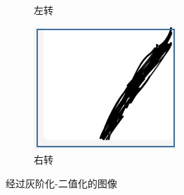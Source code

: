 \documentclass{report}
\begin{document}
\begin{figure}[ht]
\begin{subfigure}[b]{0.3\textwidth}
   \caption{左转}
   \label{fig:label}
 \end{subfigure}
 \hfill
 \begin{subfigure}[b]{0.3\textwidth}
   \centering
   \includegraphics[width=\textwidth]{figures/right.png}
   \caption{右转}
   \label{fig:label}
 \end{subfigure}
 \hfill
  \caption{经过灰阶化-二值化的图像}
\end{figure}
\end{document}
